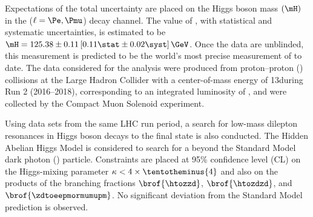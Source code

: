 % 
Expectations of the total uncertainty are placed on the Higgs boson mass $(\mH)$ in the \hzzfourl ($\ell = \Pe, \Pmu$) decay channel.
The value of \mH, with statistical and systematic uncertainties, is estimated to be $\mH = 125.38 \pm 0.11\left[0.11\stat \pm 0.02\syst \right]\GeV$.
Once the data are unblinded, this measurement is predicted to be the world's most precise measurement of \mH to date.
The data considered for the analysis were produced from proton--proton (\pp) collisions at the Large Hadron Collider with a center-of-mass energy of 13\TeV during Run 2 (2016--2018), corresponding to an integrated luminosity of \lumiruntwo, and were collected by the Compact Muon Solenoid experiment.

Using data sets from the same LHC run period, a search for low-mass dilepton resonances in Higgs boson decays to the \fourl final state is also conducted.
The Hidden Abelian Higgs Model is considered to search for a beyond the Standard Model dark photon (\PZD) particle.
Constraints are placed at 95\% confidence level (CL) on the Higgs-mixing parameter $\kappa < 4 \times \tentotheminus{4}$ and also on the products of the branching fractions $\brof{\htozzd}$, $\brof{\htozdzd}$, and $\brof{\zdtoeepmormumupm}$.
No significant deviation from the Standard Model prediction is observed.

